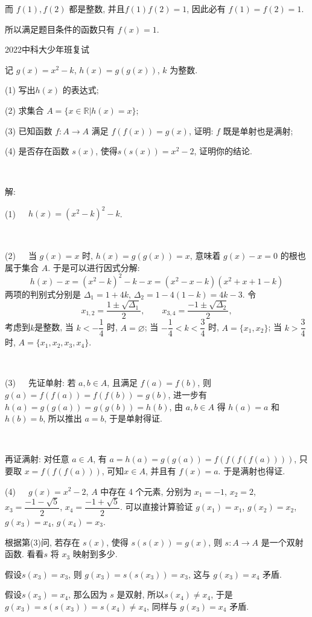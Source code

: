 而 $f(1), f(2)$ 都是整数, 并且$f(1)f(2)=1$, 因此必有 $f(1)=f(2)=1$.

所以满足题目条件的函数只有 $f(x)=1$.


\newpage
\noindent 2022中科大少年班复试

记 $g(x)=x^2-k$, $h(x)=g(g(x))$, $k$ 为整数.

(1) 写出$h(x)$ 的表达式;

(2) 求集合 $A=\{ x\in \mathbb{R} | h(x) = x\}$;

(3) 已知函数 $f: A\rightarrow A$ 满足 $f(f(x)) = g(x)$, 证明: $f$ 既是单射也是满射;

(4) 是否存在函数 $s(x)$, 使得$s(s(x))=x^2-2$, 证明你的结论.

~

\noindent 解: 

(1)\ \ \ $h(x) = (x^2-k)^2-k$.

~

(2)\ \ \ 当 $g(x)=x$ 时, $h(x)=g(g(x))=x$, 意味着 $g(x)-x=0$ 的根也属于集合 $A$. 于是可以进行因式分解:
\[ h(x)-x =  (x^2-k)^2-k - x = (x^2-x-k)(x^2+x+1-k) \]
两项的判别式分别是 $\Delta_1 = 1+4k$, $\Delta_2 = 1-4(1-k)=4k-3$. 令
\[x_{1,2}=\frac{1\pm\sqrt{\Delta_1}}{2},\qquad x_{3,4}=\frac{-1\pm\sqrt{\Delta_2}}{2} ,\]
考虑到$k$是整数,
当 $k < -\dfrac{1}{4}$ 时, $A=\varnothing$;
当 $-\dfrac{1}{4} < k < \dfrac{3}{4}$ 时, $A=\{x_1, x_2\}$;
当 $k > \dfrac{3}{4}$ 时, $A=\{x_1, x_2, x_3, x_4\}$.

~

(3)\ \ \ 先证单射: 若 $a,b\in A$, 且满足 $f(a)=f(b)$, 则 $g(a)=f(f(a))=f(f(b))=g(b)$, 进一步有 $h(a)=g(g(a))=g(g(b))=h(b)$, 由 $a,b\in A$ 得 $h(a)=a$ 和 $h(b)=b$, 所以推出 $a=b$, 于是单射得证.

~

再证满射: 对任意 $a\in A$, 有 $a = h(a)=g(g(a))=f(f(f(f(a))))$, 只要取 $x = f(f(f(a)))$, 可知$x\in A$, 并且有 $f(x)=a$. 于是满射也得证.

(4)\ \ \ $g(x)=x^2-2$, $A$ 中存在 4 个元素, 分别为 $x_1 = -1$, $x_2=2$, $x_3=\dfrac{-1-\sqrt{5}}{2}$, $x_4=\dfrac{-1+\sqrt{5}}{2}$. 可以直接计算验证 $g(x_1)=x_1$, $g(x_2)=x_2$, $g(x_3)=x_4$, $g(x_4)=x_3$. 

根据第(3)问, 若存在 $s(x)$, 使得 $s(s(x))=g(x)$, 则 $s: A\rightarrow A$ 是一个双射函数. 看看$s$ 将 $x_3$ 映射到多少. 

假设$s(x_3)=x_3$, 则 $g(x_3)=s(s(x_3))=x_3$, 这与 $g(x_3)=x_4$ 矛盾.

假设$s(x_3)=x_4$, 那么因为 $s$ 是双射, 所以$s(x_4)\ne x_4$, 于是 $g(x_3)=s(s(x_3))=s(x_4)\ne x_4$, 同样与 $g(x_3)=x_4$ 矛盾.

